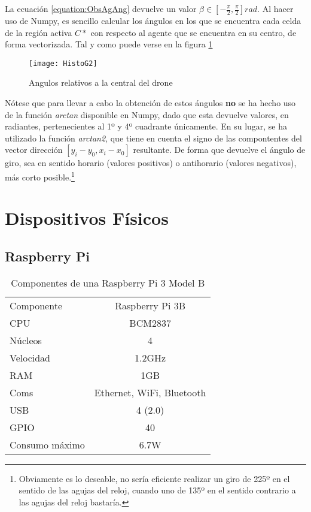La ecuación \ref{equation:ObsAgAng} devuelve un valor $\beta \in [-\frac{\pi}{2}, \frac{\pi}{2}]rad$. Al hacer uso de Numpy, es sencillo calcular los ángulos en los que se encuentra cada celda de la región activa $C*$ con respecto al agente que se encuentra en su centro, de forma vectorizada. Tal y como puede verse en la figura \ref{fig:histog2}
 \begin{figure}[H]
	\centering
	\texttt{[image: HistoG2]}
	\caption{Angulos relativos a la central del drone}\label{fig:histog2}
\end{figure}

Nótese que para llevar a cabo la obtención de estos ángulos \textbf{no} se ha hecho uso de la función \textit{arctan} disponible en Numpy, dado que esta devuelve valores, en radiantes, pertenecientes al 1º y 4º cuadrante únicamente. En su lugar, se ha utilizado la función \textit{arctan2}, que tiene en cuenta el signo de las compontentes del vector dirección $ [y_i - y_0 , x_i - x_0]$ resultante.  De forma que devuelve el ángulo de giro, sea en sentido horario (valores positivos) o antihorario (valores negativos), más corto posible.\footnote{Obviamente es lo deseable, no sería eficiente realizar un giro de 225º en el sentido de las agujas del reloj, cuando uno de 135º en el sentido contrario a las agujas del reloj bastaría.} 



\section{Dispositivos Físicos}

\subsection{Raspberry Pi}


\begin{table}[H]
	\begin{center}
		\begin{tabular}{l | c}\hline
			\toprule
			Componente & Raspberry Pi 3B\\
			\otoprule
			CPU & BCM2837\\
			Núcleos & 4\\
			Velocidad & 1.2GHz\\
			RAM & 1GB\\
			Coms & Ethernet, WiFi, Bluetooth\\
			USB & 4 (2.0)\\
			GPIO & 40\\
			Consumo máximo & 6.7W\\
			\bottomrule
		\end{tabular}
		\caption{Componentes de una Raspberry Pi 3 Model B}
		\label{tb:raspi3hardware}
	\end{center}
\end{table}

